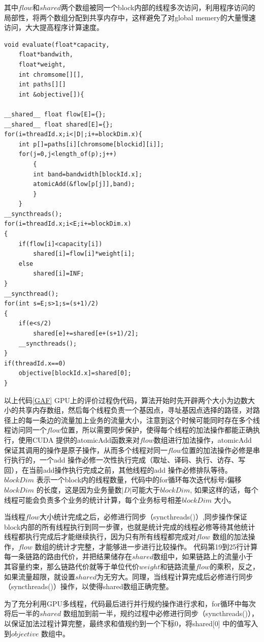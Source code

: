 其中$flow$和$shared$两个数组被同一个block内部的线程多次访问，利用程序访问的局部性，将两个数组分配到共享内存中，这样避免了对global memery的大量慢速访问，大大提高程序计算速度。
\begin{lstlisting}[caption={遗传算法并行评价代码},captionpos=b,firstnumber=1,label={GAF}]
void evaluate(float*capacity,
	float*bandwith,
	float*weight,
	int chromsome[][],
	int paths[][]
	int &objective[]){

__shared__ float flow[E]={};
__shared__ float shared[E]={};
for(i=threadId.x;i<|D|;i+=blockDim.x){
	int p[]=paths[i][chromsome[blockid][i]];
	for(j=0,j<length_of(p);j++)
		{
		int band=bandwidth[blockId.x];
		atomicAdd(&flow[p[j]],band);
		} 
	}
__syncthreads();
for(i=threadId.x;i<E;i+=blockDim.x)
{
	if(flow[i]<capacity[i])
		shared[i]=flow[i]*weight[i]; 
	else	
		shared[i]=INF; 
}
__syncthread();
for(int s=E;s>1;s=(s+1)/2)
{ 
	if(e<s/2)
		shared[e]+=shared[e+(s+1)/2];
	__syncthreads();
}
if(threadId.x==0)
	objective[blockId.x]=shared[0];
}
\end{lstlisting}
以上代码\ref{GAF} GPU上的评价过程伪代码，算法开始时先开辟两个大小为边数大小的共享内存数组，然后每个线程负责一个基因点，寻址基因点选择的路径，对路径上的每一条边的流量加上业务的流量大小，注意到这个时候可能同时存在多个线程访问同一个$flow$位置，所以需要同步保护，使得每个线程的加法操作都能正确执行，使用CUDA 提供的atomicAdd函数来对$flow$数组进行加法操作，atomicAdd 保证其调用的操作是原子操作，从而多个线程对同一$flow$位置的加法操作必修是串行执行的，一个add 操作必修一次性执行完成（取址、译码、执行、访存、写回），在当前add操作执行完成之前，其他线程的add 操作必修排队等待。$blockDim$ 表示一个block内的线程数量，代码中的for循环每次迭代标号$i$偏移$blockDim$ 的长度，这是因为业务量数$|D|$可能大于$blockDim$, 如果这样的话，每个线程可能会负责多个业务的统计计算，每个业务标号相差$blockDim$ 大小。

当线程$flow$大小统计完成之后，必修进行同步（syncthreads()）,同步操作保证block内部的所有线程执行到同一步骤，也就是统计完成的线程必修等待其他统计线程都执行完成后才能继续执行，因为只有所有线程都完成对$flow$ 数组的加法操作，$flow$ 数组的统计才完整，才能够进一步进行比较操作。
代码第19到25行计算每一条链路的路由代价，并把结果储存在$shared$数组中，如果链路上的流量小于其容量约束，那么链路代价就等于单位代价$weight$和链路流量$flow$的乘积，反之，如果流量超限，就设置$shared$为无穷大。同理，当线程计算完成后必修进行同步（syncthreads()）操作，以使得shared数组正确完整。 

为了充分利用GPU多线程，代码最后进行并行规约操作进行求和，for循环中每次将后一半的$shared$ 数组加到前一半，规约过程中必修进行同步（syncthreads()），以保证加法过程计算完整，最终求和值规约到一个下标0，将shared[0] 中的值写入到$objective$ 数组中。

